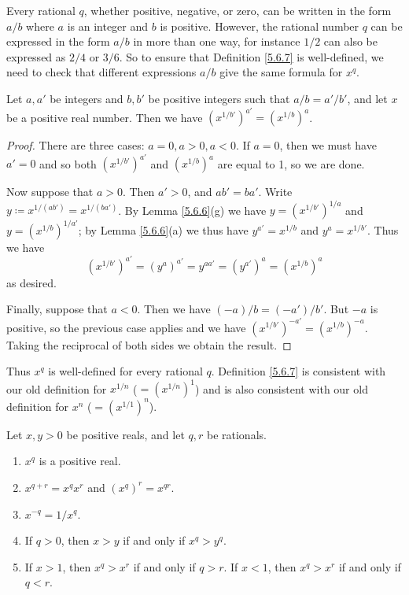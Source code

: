 \begin{note}
    Every rational \(q\), whether positive, negative, or zero, can be written in the form \(a / b\) where \(a\) is an integer and \(b\) is positive.
    However, the rational number \(q\) can be expressed in the form \(a / b\) in more than one way, for instance \(1 / 2\) can also be expressed as \(2 / 4\) or \(3 / 6\).
    So to ensure that Definition \ref{5.6.7} is well-defined, we need to check that different expressions \(a / b\) give the same formula for \(x^q\).
\end{note}

\begin{lemma}\label{5.6.8}
    Let \(a, a'\) be integers and \(b, b'\) be positive integers such that \(a / b = a' / b'\), and let \(x\) be a positive real number.
    Then we have \((x^{1 / b'})^{a'} = (x^{1 / b})^a\).
\end{lemma}

\begin{proof}
    There are three cases: \(a = 0, a > 0, a < 0\).
    If \(a = 0\), then we must have \(a' = 0\) and so both \((x^{1 / b'})^{a'}\) and \((x^{1 / b})^a\) are equal to 1, so we are done.

    Now suppose that \(a > 0\).
    Then \(a' > 0\), and \(ab' = ba'\).
    Write \(y \coloneqq x^{1 / (ab')} = x^{1 / (ba')}\).
    By Lemma \ref{5.6.6}(g) we have \(y = (x^{1 / b'})^{1 / a}\) and \(y = (x^{1 / b})^{1 / a'}\);
    by Lemma \ref{5.6.6}(a) we thus have \(y^{a'} = x^{1 / b}\) and \(y^a = x^{1 / b'}\).
    Thus we have
    \[
        (x^{1 / b'})^{a'} = (y^a)^{a'} = y^{aa'} = (y^{a'})^a = (x^{1 / b})^a
    \]
    as desired.

    Finally, suppose that \(a < 0\).
    Then we have \((-a) / b = (-a') / b'\).
    But \(-a\) is positive, so the previous case applies and we have \((x^{1 / b'})^{-a'} = (x^{1 / b})^{-a}\).
    Taking the reciprocal of both sides we obtain the result.
\end{proof}

\begin{note}
    Thus \(x^q\) is well-defined for every rational \(q\).
    Definition \ref{5.6.7} is consistent with our old definition for \(x^{1 / n}\) (\(= (x^{1 / n})^1\)) and is also consistent with our old definition for \(x^n\) (\(= (x^{1 / 1})^n\)).
\end{note}

\begin{lemma}\label{5.6.9}
    Let \(x, y > 0\) be positive reals, and let \(q, r\) be rationals.
    \begin{enumerate}
        \item \(x^q\) is a positive real.
        \item \(x^{q + r} = x^q x^r\) and \((x^q)^r = x^{qr}\).
        \item \(x^{-q} = 1 / x^q\).
        \item If \(q > 0\), then \(x > y\) if and only if \(x^q > y^q\).
        \item If \(x > 1\), then \(x^q > x^r\) if and only if \(q > r\).
              If \(x < 1\), then \(x^q > x^r\) if and only if \(q < r\).
    \end{enumerate}
\end{lemma}

